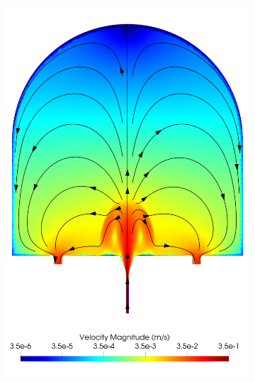 \begin{figure}
\begin{subfigure}[b]{0.45\textwidth}
            \includegraphics[width=\textwidth]{diagrams/results-modelling/velocity-transport/meshandsoln_dg_velocity_placentone_ns-b_velocity-log.png}
            \caption{}
        \end{subfigure}
        \hfill
        \begin{subfigure}[b]{0.45\textwidth}
            \centering

\end{subfigure}
\end{figure}
